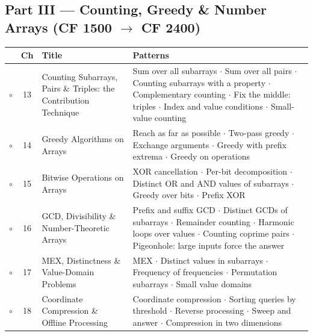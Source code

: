 \subsection*{Part III --- Counting, Greedy \& Number Arrays (CF 1500 $\to$ CF 2400)}
\begin{tabularx}{\linewidth}{@{}c c >{\raggedright\arraybackslash}p{3.6cm} X@{}}
\toprule
& \textbf{Ch} & \textbf{Title} & \textbf{Patterns} \\
\midrule
$\circ$ & 13 & Counting Subarrays, Pairs \& Triples: the Contribution Technique & Sum over all subarrays $\cdot$ Sum over all pairs $\cdot$ Counting subarrays with a property $\cdot$ Complementary counting $\cdot$ Fix the middle: triples $\cdot$ Index and value conditions $\cdot$ Small-value counting \\
$\circ$ & 14 & Greedy Algorithms on Arrays & Reach as far as possible $\cdot$ Two-pass greedy $\cdot$ Exchange arguments $\cdot$ Greedy with prefix extrema $\cdot$ Greedy on operations \\
$\circ$ & 15 & Bitwise Operations on Arrays & XOR cancellation $\cdot$ Per-bit decomposition $\cdot$ Distinct OR and AND values of subarrays $\cdot$ Greedy over bits $\cdot$ Prefix XOR \\
$\circ$ & 16 & GCD, Divisibility \& Number-Theoretic Arrays & Prefix and suffix GCD $\cdot$ Distinct GCDs of subarrays $\cdot$ Remainder counting $\cdot$ Harmonic loops over values $\cdot$ Counting coprime pairs $\cdot$ Pigeonhole: large inputs force the answer \\
$\circ$ & 17 & MEX, Distinctness \& Value-Domain Problems & MEX $\cdot$ Distinct values in subarrays $\cdot$ Frequency of frequencies $\cdot$ Permutation subarrays $\cdot$ Small value domains \\
$\circ$ & 18 & Coordinate Compression \& Offline Processing & Coordinate compression $\cdot$ Sorting queries by threshold $\cdot$ Reverse processing $\cdot$ Sweep and answer $\cdot$ Compression in two dimensions \\
\bottomrule
\end{tabularx}

